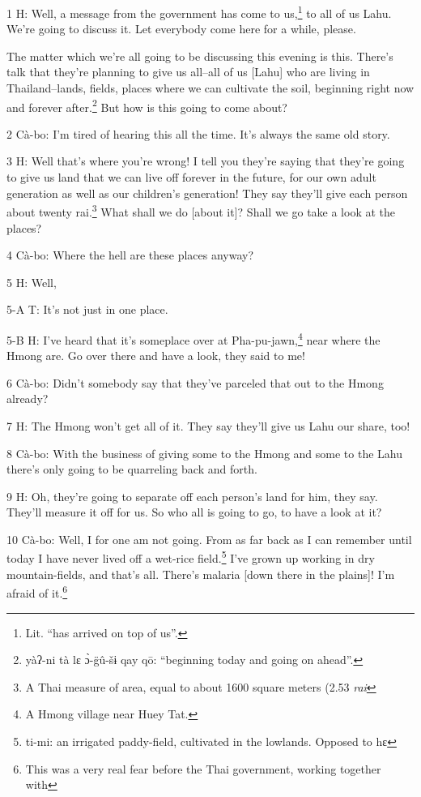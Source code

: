 
1 H: Well, a message from the government has come to us,\footnote{Lit. ``has arrived on top of us''.} to all of us Lahu.
We're going to discuss it. Let everybody come here for a while, please.

The matter which we're all going to be discussing this evening is this. There's
talk that they're planning to give us all--all of us [Lahu] who are living in Thailand--lands,
fields, places where we can cultivate the soil, beginning right now and forever
after.\footnote{yàʔ-ni tà lɛ ɔ̀-g̈û-šɨ qay qō: ``beginning today and going on ahead''.} But how is this going to come about?

2 Cà-bo: I'm tired of hearing this all the time. It's always the same old story.

3 H: Well that's where you're wrong! I tell you they're saying that they're going
to give us land that we can live off forever in the future, for our own adult generation
as well as our children's generation! They say they'll give each person about twenty
rai.\footnote{A Thai measure of area, equal to about 1600 square meters (2.53 \textit{rai}} What shall we do [about it]? Shall we go take a look at the places?

4 Cà-bo: Where the hell are these places anyway?

5 H: Well,

5-A T: It's not just in one place.

5-B H: I've heard that it's someplace over at Pha-pu-jawn,\footnote{A Hmong village near Huey Tat.} near where the Hmong
are. Go over there and have a look, they said to me!

6 Cà-bo: Didn't somebody say that they've parceled that out to the Hmong already?

7 H: The Hmong won't get all of it. They say they'll give us Lahu our share, too!

8 Cà-bo: With the business of giving some to the Hmong and some to the Lahu there's
only going to be quarreling back and forth.

9 H: Oh, they're going to separate off each person's land for him, they say. They'll
measure it off for us. So who all is going to go, to have a look at it?

10 Cà-bo: Well, I for one am not going. From as far back as I can remember until
today I have never lived off a wet-rice field.\footnote{ti-mi: an irrigated paddy-field, cultivated in the lowlands. Opposed to hɛ} I've grown up working in dry
mountain-fields, and that's all. There's malaria [down there in the plains]! I'm
afraid of it.\footnote{This was a very real fear before the Thai government, working together with}

